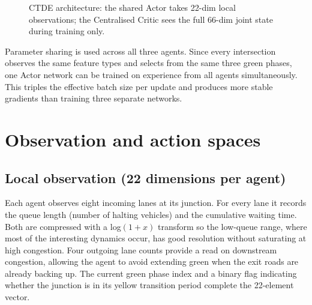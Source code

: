 \documentclass[11pt, a4paper]{report}
\begin{document}
\begin{figure}[H]
\centering
{}
\caption{CTDE architecture: the shared Actor takes 22-dim local observations; the Centralised Critic sees the full 66-dim joint state during training only.}
\label{fig:ctde_arch}
\end{figure}

Parameter sharing is used across all three agents. Since every intersection observes the same feature types and selects from the same three green phases, one Actor network can be trained on experience from all agents simultaneously. This triples the effective batch size per update and produces more stable gradients than training three separate networks.

\section{Observation and action spaces}

\subsection{Local observation (22 dimensions per agent)}

Each agent observes eight incoming lanes at its junction. For every lane it records the queue length (number of halting vehicles) and the cumulative waiting time. Both are compressed with a log$(1+x)$ transform so the low-queue range, where most of the interesting dynamics occur, has good resolution without saturating at high congestion. Four outgoing lane counts provide a read on downstream congestion, allowing the agent to avoid extending green when the exit roads are already backing up. The current green phase index and a binary flag indicating whether the junction is in its yellow transition period complete the 22-element vector.
\end{document}
